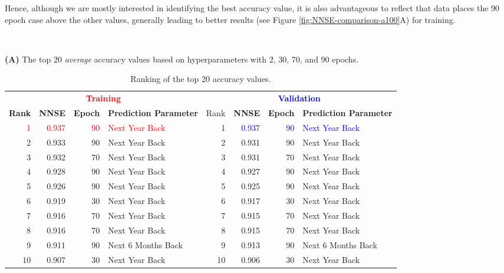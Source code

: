 \documentclass[utf8]{FrontiersinVancouver} %
\begin{document}
Hence, although we are mostly interested in identifying the best accuracy value, it is also advantageous to reflect that data places the 90 epoch case above the other values, generally leading to better results (see Figure \ref{fig:NNSE-comparison-a100}A) for training.


    \begin{table}
    \caption{Ranking of the top 20 accuracy values.}\
      \label{tab:ranking-accuracy}
    
        {\bf (A)} The top 20 {\em average} accuracy values based on hyperparameters with 2, 30, 70, and 90 epochs.\

\renewcommand{\arraystretch}{1.2}
      \begin{center}
        {\footnotesize
    \begin{tabular}{|r|r|r|l| |r|r|r|l|}
      \hline
     \multicolumn{4}{|c||}{\bf \textcolor{red}{Training}}  & \multicolumn{4}{c|}{\bf \textcolor{blue}{Validation}}  \\
    {\bf Rank} &  {\bf NNSE} &  {\bf Epoch} & {\bf Prediction Parameter} & Rank & {\bf NNSE} &  {\bf Epoch} & {\bf Prediction Parameter}\\
    \hline
    \hline
        \textcolor{red}{1}  &  \textcolor{red}{0.937} &     \textcolor{red}{90} &  \textcolor{red}{Next Year Back} &  1 & \textcolor{blue}{0.937} &     \textcolor{blue}{90} &  \textcolor{blue}{Next Year Back} \\
    2  &  0.933 &     90 &      Next Year Back &  2 & 0.931 &     90 &      Next Year Back \\
3  &  0.932 &     70 &      Next Year Back &  3 & 0.931 &     70 &      Next Year Back \\
4  &  0.928 &     90 &      Next Year Back &  4 & 0.927 &     90 &      Next Year Back \\
5  &  0.926 &     90 &      Next Year Back &  5 & 0.925 &     90 &      Next Year Back \\
6  &  0.919 &     30 &      Next Year Back &  6 & 0.917 &     30 &      Next Year Back \\
7  &  0.916 &     70 &      Next Year Back &  7 & 0.915 &     70 &      Next Year Back \\
8  &  0.916 &     70 &      Next Year Back &  8 & 0.915 &     70 &      Next Year Back \\
9  &  0.911 &     90 &  Next 6 Months Back &  9 & 0.913 &     90 &  Next 6 Months Back \\
10  &  0.907 &     30 &      Next Year Back &  10 & 0.906 &     30 &      Next Year Back \\

\end{tabular}}
\end{center}
\end{table}
\end{document}
